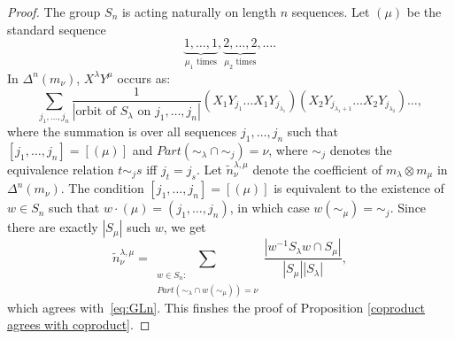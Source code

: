 \documentclass[10pt,a4paper]{amsart}
\begin{document}
\begin{proof}
The group $S_n$ is acting naturally on length $n$ sequences. Let $(\mu)$ be the standard sequence
\[
    \underbrace{1,\ldots,1}_{\mu_1\text{ times}},\underbrace{2,\ldots,2}_{\mu_2\text{ times}},\ldots.
\]
In $\Delta^{n}(m_{\nu})$, $X^\lambda Y^\mu$ occurs as:
\[
    \sum_{j_1,\ldots,j_n}\frac{1}{|\text{orbit of }S_\lambda\text{ on }j_{1},\ldots,j_{n}|}(X_1Y_{j_1}\ldots X_1Y_{j_{\lambda_1}})(X_2Y_{j_{\lambda_1+1}}\ldots X_2Y_{j_{\lambda_2}})\ldots,
\]
where the summation is over all sequences $j_1,\ldots,j_n$ such that $[j_{1},\ldots,j_{n}]=[(\mu)]$ and $Part(\sim_\lambda\cap\sim_j)=\nu$, where $\sim_j$ denotes the equivalence relation $t\sim_j s$ iff $j_t=j_s$.
Let $\widetilde{n}_{\nu}^{\lambda,\mu}$ denote the coefficient of $m_{\lambda}\otimes m_{\mu}$ in $\Delta^{n}(m_{\nu})$.
The condition $[j_1,\ldots,j_n]=[(\mu)]$ is equivalent to the existence of $w\in S_n$ such that $w\cdot(\mu)=(j_1,\ldots,j_n)$, in which case $w(\sim_\mu)=\sim_j$. Since there are exactly $|S_\mu|$ such $w$, we get
\[
\widetilde{n}_\nu^{\lambda,\mu}
  =
  \sum_{\substack{w\in S_n\colon
  \\
  Part(\sim_\lambda\cap w(\sim_\mu))=\nu}}\frac{|w^{-1}S_{\lambda}w\cap S_{\mu}|}{|S_\mu||S_\lambda|},
\]
which agrees with~\eqref{eq:GLn}.
This finshes the proof of Proposition \ref{coproduct agrees with coproduct}.
\end{proof}
\end{document}
